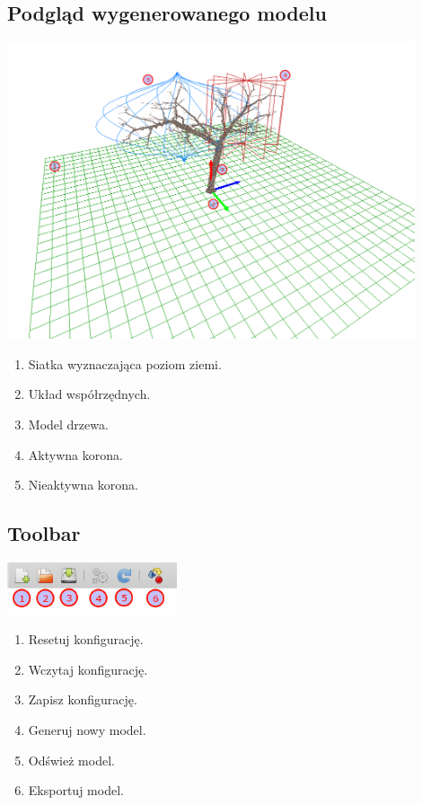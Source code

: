 \subsection{Podgląd wygenerowanego modelu}
\includegraphics[width=120mm]{images/gui/model_view.png}
\begin{enumerate}
	\item {Siatka wyznaczająca poziom ziemi.}
	\item {Układ współrzędnych.}
	\item {Model drzewa.}
	\item {Aktywna korona.}
	\item {Nieaktywna korona.}
\end{enumerate}

\subsection{Toolbar}
\includegraphics[width=50mm]{images/gui/toolbar.png}
\begin{enumerate}
	\item {Resetuj konfigurację.}
	\item {Wczytaj konfigurację.}
	\item {Zapisz konfigurację.}
	\item {Generuj nowy model.}
	\item {Odśwież model.}
	\item {Eksportuj model.}
\end{enumerate}


